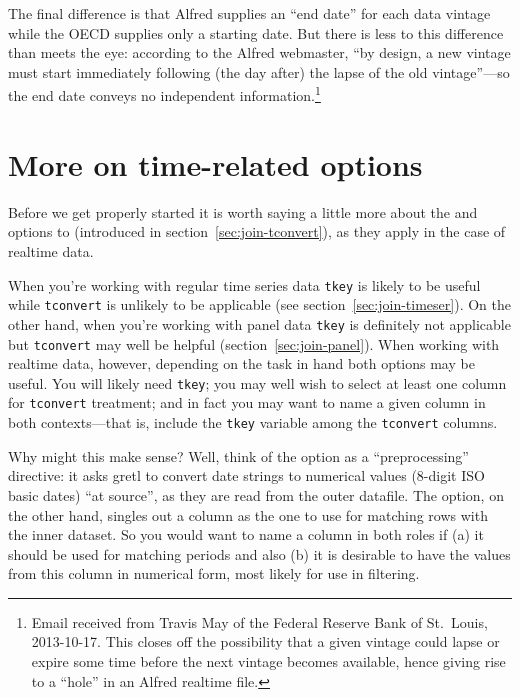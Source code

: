 The final difference is that Alfred supplies an ``end date'' for each
data vintage while the OECD supplies only a starting date. But there
is less to this difference than meets the eye: according to the Alfred
webmaster, ``by design, a new vintage must start immediately following
(the day after) the lapse of the old vintage''---so the end date
conveys no independent information.\footnote{Email received from
  Travis May of the Federal Reserve Bank of St.\ Louis, 2013-10-17.
  This closes off the possibility that a given vintage could lapse or
  expire some time before the next vintage becomes available, hence
  giving rise to a ``hole'' in an Alfred realtime file.}

\section{More on time-related options}
\label{sec:realtime-tconvert}

Before we get properly started it is worth saying a little more about
the  and  options to 
(introduced in section~\ref{sec:join-tconvert}), as they apply in
the case of realtime data.

When you're working with regular time series data \texttt{tkey} is
likely to be useful while \texttt{tconvert} is unlikely to be
applicable (see section~\ref{sec:join-timeser}). On the other hand,
when you're working with panel data \texttt{tkey} is definitely not
applicable but \texttt{tconvert} may well be helpful
(section~\ref{sec:join-panel}). When working with realtime data,
however, depending on the task in hand both options may be useful. You
will likely need \texttt{tkey}; you may well wish to select at least
one column for \texttt{tconvert} treatment; and in fact you may want
to name a given column in both contexts---that is, include the
\texttt{tkey} variable among the \texttt{tconvert} columns.

Why might this make sense? Well, think of the  option
as a ``preprocessing'' directive: it asks gretl to convert date
strings to numerical values (8-digit ISO basic dates) ``at source'',
as they are read from the outer datafile. The  option, on
the other hand, singles out a column as the one to use for matching
rows with the inner dataset. So you would want to name a column in
both roles if (a) it should be used for matching periods and also (b)
it is desirable to have the values from this column in numerical
form, most likely for use in filtering.

